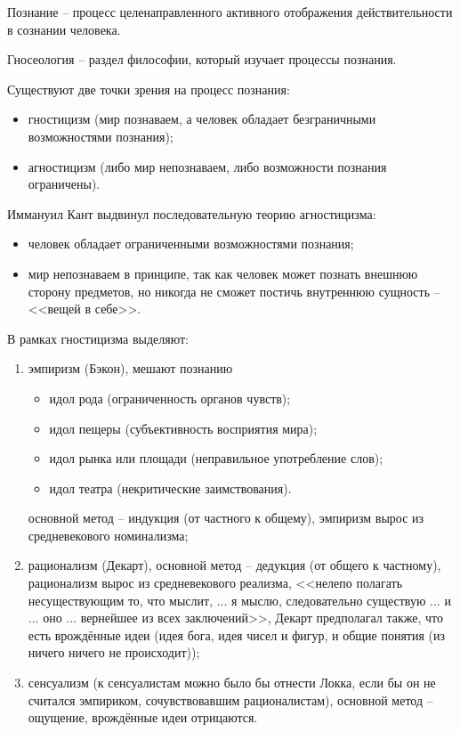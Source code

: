 
Познание -- процесс целенаправленного активного отображения действительности в сознании человека.

Гносеология -- раздел философии, который изучает процессы познания.

Существуют две точки зрения на процесс познания:
\begin{itemize}
	\item гностицизм (мир познаваем, а человек обладает безграничными возможностями познания);
	\item агностицизм (либо мир непознаваем, либо возможности познания ограничены).
\end{itemize}

Иммануил Кант выдвинул последовательную теорию агностицизма:
\begin{itemize}
	\item человек обладает ограниченными возможностями познания;
	\item мир непознаваем в принципе, так как человек может познать внешнюю сторону предметов, но никогда не сможет постичь внутреннюю сущность -- <<вещей в себе>>.
\end{itemize}

В рамках гностицизма выделяют:
\begin{enumerate}
	\item эмпиризм (Бэкон), мешают познанию
	\begin{itemize}
		\item идол рода (ограниченность органов чувств);
		\item идол пещеры (субъективность восприятия мира);
		\item идол рынка или площади (неправильное употребление слов);
		\item идол театра (некритические заимствования).
	\end{itemize}
	основной метод -- индукция (от частного к общему),  эмпиризм вырос из средневекового номинализма;
	\item рационализм (Декарт),
	основной метод -- дедукция (от общего к частному),  рационализм вырос из средневекового реализма,
	<<нелепо полагать несуществующим то, что мыслит, ... я мыслю, следовательно существую ... и ... оно ... вернейшее из всех заключений>>, Декарт предполагал также, что есть врождённые идеи (идея бога, идея чисел и фигур, и общие понятия (из ничего ничего не происходит)); 
	\item сенсуализм (к сенсуалистам можно было бы отнести Локка, если бы он не считался эмпириком, сочувствовавшим рационалистам), основной метод -- ощущение, врождённые идеи отрицаются. 
\end{enumerate} 

